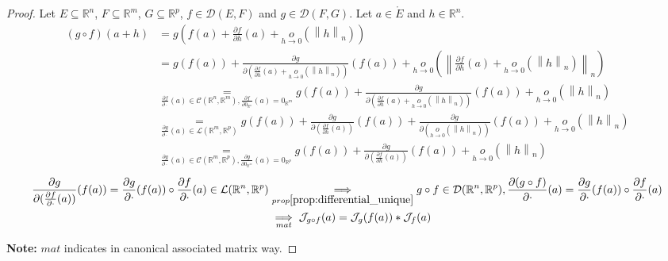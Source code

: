 \documentclass[11pt,en]{elegantpaper}
\newcommand{\norm}[1]{\left\lVert#1\right\rVert}
\newcommand{\Real}{\mathbb{R}}
\begin{document}
\begin{proof}
  Let $E \subseteq \Real^n$, $F \subseteq \Real^m$, $G \subseteq \Real^p$, $f \in \mathcal{D}(E,F)$ and $g \in \mathcal{D}(F,G)$.
  Let $a \in \mathring{E}$ and $h \in \Real^n$.
  \begin{equation*}
    \begin{split}
      (g \circ f)(a+h) & = g(f(a) + \frac{\partial f}{\partial h}(a) + \underset{h \to 0}o(\norm h _n)) \\
      & = g(f(a)) + \frac{\partial g}{\partial (\frac{\partial f}{\partial h}(a) + \underset{h \to 0}o(\norm h _n))}(f(a))
        + \underset{h \to 0}o(\norm{\frac{\partial f}{\partial h}(a) + \underset{h \to 0}o(\norm h _n)}_n) \\
      & \underset{\frac{\partial f}{\partial \cdot}(a) \in \mathcal{C}(\Real^n,\Real^m),\frac{\partial f}{\partial 0_{\Real^n}}(a) = 0_{\Real^m}}
        = g(f(a)) + \frac{\partial g}{\partial (\frac{\partial f}{\partial h}(a) + \underset{h \to 0}o(\norm h _n))}(f(a)) + \underset{h \to 0}o(\norm h _n) \\
      & \underset{\frac{\partial g}{\partial \cdot}(a) \in \mathcal{L}(\Real^m,\Real^p)}
        = g(f(a)) + \frac{\partial g}{\partial (\frac{\partial f}{\partial h}(a))}(f(a)) + \frac{\partial g}{\partial (\underset{h \to 0}o(\norm h _n))}(f(a)) + \underset{h \to 0}o(\norm h _n) \\
      & \underset{\frac{\partial g}{\partial \cdot}(a) \in \mathcal{C}(\Real^m,\Real^p),\frac{\partial g}{\partial 0_{\Real^m}}(a) = 0_{\Real^p}}
        = g(f(a)) + \frac{\partial g}{\partial (\frac{\partial f}{\partial h}(a))}(f(a)) + \underset{h \to 0}o(\norm h _n)
    \end{split}
  \end{equation*}
  \begin{equation*}
    \begin{split}
      \frac{\partial g}{\partial (\frac{\partial f}{\partial \cdot}(a))}(f(a)) = \frac{\partial g}{\partial \cdot}(f(a)) \circ \frac{\partial f}{\partial \cdot}(a) \in \mathcal{L}(\Real^n, \Real^p)
      & \underset{prop\ref{prop:differential_unique}}\implies g \circ f \in \mathcal{D}(\Real^n, \Real^p), \frac{\partial (g \circ f)}{\partial \cdot}(a) = \frac{\partial g}{\partial \cdot}(f(a)) \circ \frac{\partial f}{\partial \cdot}(a) \\
      & \underset{mat}\implies \mathcal{J}_{g \circ f}(a) = \mathcal{J}_{g}(f(a)) * \mathcal{J}_{f}(a)
    \end{split}
  \end{equation*} \par

  \textbf{Note:} $mat$ indicates in canonical associated matrix way. \par
\end{proof}
\end{document}

